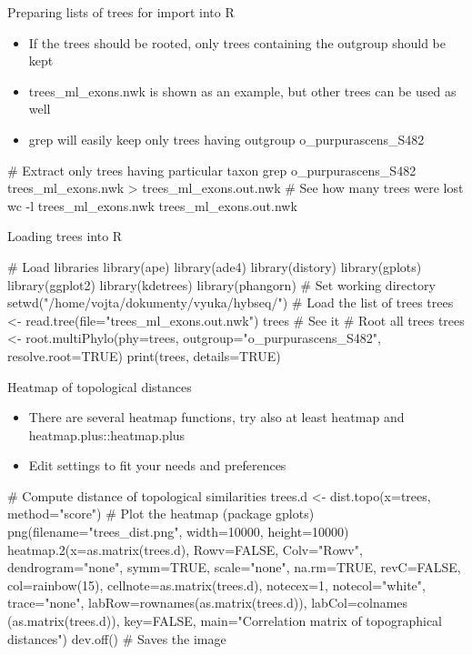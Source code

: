 \documentclass[compress, ucs, xelatex, 11pt, xcolor=x11names, aspectratio=169,
	hyperref={
		bookmarks=true,
		unicode=true,
		colorlinks=true,
		pdftitle={HybSeq course},
		plainpages=false,
		pdfauthor={Vojtech Zeisek},
		pdfsubject={Practical processing of HybSeq target enrichment sequencing data on computing grids like MetaCentrum},
		pdfcreator={XeLaTeX},
		pdfkeywords={BASH, command line, GNU, HybSeq, Linux, MetaCentrum, sequencing shell, target enrichment},
		linkcolor=Turquoise4, %
		anchorcolor=DodgerBlue4, %
		citecolor=DodgerBlue4, %
		filecolor=DodgerBlue4, %
		menucolor=Tan4, %
		urlcolor=DarkOliveGreen4, %
		pdftex},
	url={hyphens, lowtilde} %
	]{beamer}
\renewcommand{\texttt}[1]{\colorbox{Cornsilk2}{{\ttfamily #1}}}
\begin{document}
\begin{frame}[fragile]{Preparing lists of trees for import into R}
	\begin{itemize}
		\item If the trees should be rooted, only trees containing the outgroup should be kept
		\item \texttt{trees\_ml\_exons.nwk} is shown as an example, but other trees can be used as well
		\item \texttt{grep} will easily keep only trees having outgroup \texttt{o\_purpurascens\_S482}
	\end{itemize}
	\begin{bashcode}
    # Extract only trees having particular taxon
    grep o_purpurascens_S482 trees_ml_exons.nwk > trees_ml_exons.out.nwk
    # See how many trees were lost
    wc -l trees_ml_exons.nwk trees_ml_exons.out.nwk
	\end{bashcode}
\end{frame}

\begin{frame}[fragile]{Loading trees into R}
	\begin{spluscode}
    # Load libraries
    library(ape)
    library(ade4)
    library(distory)
    library(gplots)
    library(ggplot2)
    library(kdetrees)
    library(phangorn)
    # Set working directory
    setwd("/home/vojta/dokumenty/vyuka/hybseq/")
    # Load the list of trees
    trees <- read.tree(file="trees_ml_exons.out.nwk")
    trees # See it
    # Root all trees
    trees <- root.multiPhylo(phy=trees, outgroup="o_purpurascens_S482",
      resolve.root=TRUE)
    print(trees, details=TRUE)
	\end{spluscode}
\end{frame}

\begin{frame}[fragile]{Heatmap of topological distances}
	\begin{itemize}
		\item There are several heatmap functions, try also at least \texttt{heatmap} and \texttt{heatmap.plus::heatmap.plus}
		\item Edit settings to fit your needs and preferences
	\end{itemize}
	\begin{spluscode}
    # Compute distance of topological similarities
    trees.d <- dist.topo(x=trees, method="score")
    # Plot the heatmap (package gplots)
    png(filename="trees_dist.png", width=10000, height=10000)
      heatmap.2(x=as.matrix(trees.d), Rowv=FALSE, Colv="Rowv",
        dendrogram="none", symm=TRUE, scale="none", na.rm=TRUE,
        revC=FALSE, col=rainbow(15), cellnote=as.matrix(trees.d),
        notecex=1, notecol="white", trace="none",
        labRow=rownames(as.matrix(trees.d)), labCol=colnames
        (as.matrix(trees.d)), key=FALSE, main="Correlation
        matrix of topographical distances")
      dev.off() # Saves the image
	\end{spluscode}
\end{frame}
\end{document}
